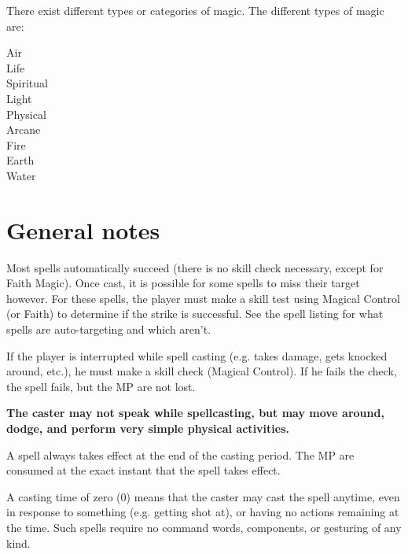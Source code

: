 \documentclass[twoside]{book}
\begin{document}
    {  
      There exist different types or categories of magic.
               The different types of magic are: 
    }
  
\begin{description}
    
  \item[ Air ] 
  \item[ Life ] 
  \item[ Spiritual ] 
  \item[ Light ] 
  \item[ Physical ] 
  \item[ Arcane ] 
  \item[ Fire ] 
  \item[ Earth ] 
  \item[ Water ] 
\end{description}
  
    

\section{General notes}
    
    {  
      Most spells automatically succeed (there is no skill
             check necessary, except for Faith Magic). Once cast, it is
             possible for some spells to miss their target however. For
             these spells, the player must make a skill test using
             Magical Control (or Faith) to determine if the strike is
             successful. See the spell listing for what spells are
             auto-targeting and which aren't. 
    }
  
    {  
      If the player is interrupted while spell casting (e.g.
            takes damage, gets knocked around, etc.), he must make a
            skill check (Magical Control). If he fails the check, the
            spell fails, but the MP are not lost.
              

 \textbf{ The caster may not speak while spellcasting, but may
               move around, dodge, and perform very simple physical
               activities. }


          
    }
  
    {  
      A spell always takes effect at the end of the casting
             period. The MP are consumed at the exact instant that the
             spell takes effect. 
    }
  
    {  
      A casting time of zero (0) means that the caster may
             cast the spell anytime, even in response to something (e.g.
             getting shot at), or having no actions remaining at the
             time. Such spells require no command words, components, or
             gesturing of any kind. 
    }
  
\end{document}
